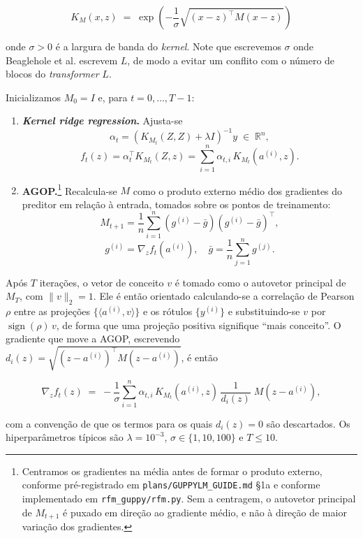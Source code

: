 \[
  K_M(x,z) \;=\; \exp\!\left(-\frac{1}{\sigma}\sqrt{(x-z)^{\top} M (x-z)}\right)
\]

onde $\sigma>0$ é a largura de banda do \textit{kernel}. Note que escrevemos $\sigma$ onde
Beaglehole et al. escrevem $L$, de modo a evitar um conflito com o número de blocos do
\textit{transformer} $L$.

Inicializamos $M_0 = I$ e, para $t = 0, \dots, T-1$:

\begin{enumerate}
  \item \textbf{\textit{Kernel ridge regression}.} Ajusta-se
  \[
    \alpha_t = \left(K_{M_t}(Z,Z) + \lambda I\right)^{-1} y \;\in\; \mathbb{R}^{n},
  \]
  \[
    f_t(z) = \alpha_t^{\top} K_{M_t}(Z,z) = \sum_{i=1}^{n} \alpha_{t,i}\, K_{M_t}\!\left(a^{(i)}, z\right).
  \]

  \item \textbf{AGOP.}\footnote{Centramos os gradientes na média antes de formar o produto
externo, conforme pré-registrado em \texttt{plans/GUPPYLM\_GUIDE.md} §1a e conforme
implementado em \texttt{rfm\_guppy/rfm.py}. Sem a centragem, o autovetor principal de
$M_{t+1}$ é puxado em direção ao gradiente médio, e não à direção de maior variação dos
gradientes.} Recalcula-se $M$ como o produto externo médio dos gradientes do preditor em
  relação à entrada, tomados sobre os pontos de treinamento:
  \[
    M_{t+1} = \frac{1}{n}\sum_{i=1}^{n}
      \left(g^{(i)} - \bar{g}\right)\left(g^{(i)} - \bar{g}\right)^{\top},
  \]
  \[
    g^{(i)} = \nabla_z f_t\!\left(a^{(i)}\right),
    \quad \bar{g} = \frac{1}{n}\sum_{j=1}^{n} g^{(j)} .
  \]
\end{enumerate}

Após $T$ iterações, o vetor de conceito $v$ é tomado como o autovetor principal de $M_T$,
com $\|v\|_2 = 1$. Ele é então orientado calculando-se a correlação de Pearson $\rho$
entre as projeções $\{\langle a^{(i)}, v\rangle\}$ e os rótulos $\{y^{(i)}\}$ e
substituindo-se $v$ por $\operatorname{sign}(\rho)\, v$, de forma que uma projeção positiva
signifique ``mais conceito''. O gradiente que move a AGOP, escrevendo
$d_i(z) = \sqrt{(z - a^{(i)})^{\top} M (z - a^{(i)})}$, é então

\[
  \nabla_z f_t(z) \;=\; -\frac{1}{\sigma}\sum_{i=1}^{n}
    \alpha_{t,i}\, K_{M_t}\!\left(a^{(i)}, z\right)\,
    \frac{1}{d_i(z)}\; M\left(z - a^{(i)}\right),
\]

com a convenção de que os termos para os quais $d_i(z) = 0$ são descartados. Os
hiperparâmetros típicos são $\lambda = 10^{-3}$, $\sigma \in \{1, 10, 100\}$ e
$T \leq 10$.

